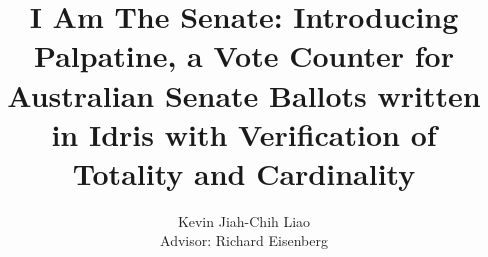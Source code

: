 \documentclass[a4paper,12pt,twoside]{report}
\begin{document}
\title{\LARGE {\bf I Am The Senate: Introducing Palpatine, a Vote Counter for Australian Senate Ballots written in Idris with Verification of Totality and Cardinality}\\
 \vspace*{6mm}
}

\author{Kevin Jiah-Chih Liao\\[1cm]{\small Advisor: Richard Eisenberg}}

\normallinespacing
\maketitle

\preface




\body





\appendix




\end{document}
